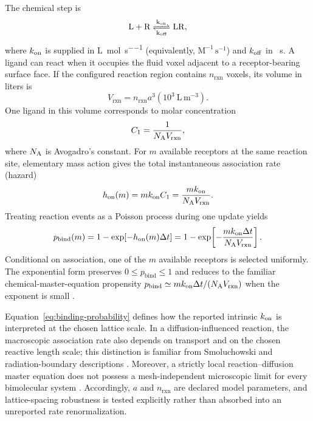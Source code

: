 The chemical step is
\begin{equation}
 \ce{L + R <=>[k_{on}][k_{off}] LR},
 \label{eq:reaction}
\end{equation}
where $k_{\mathrm{on}}$ is supplied in \si{\liter\per\mole\per\second} (equivalently,
$\mathrm{M}^{-1}\,\mathrm{s}^{-1}$) and $k_{\mathrm{off}}$ in
\si{\per\second}.  A ligand can react when it occupies the fluid voxel adjacent
to a receptor-bearing surface face.  If the configured reaction region
contains $n_{\mathrm{rxn}}$ voxels, its volume in liters is
\begin{equation}
 V_{\mathrm{rxn}}
 =n_{\mathrm{rxn}}a^3\left(10^3\ \mathrm{L\,m^{-3}}\right).
 \label{eq:reaction-volume}
\end{equation}
One ligand in this volume corresponds to molar concentration
\begin{equation}
 C_1=\frac{1}{N_{\mathrm A} V_{\mathrm{rxn}}},
 \label{eq:one-particle-concentration}
\end{equation}
where $N_{\mathrm A}$ is Avogadro's constant.  For $m$ available receptors at the same
reaction site, elementary mass action gives the total instantaneous
association rate (hazard)
\begin{equation}
 h_{\mathrm{on}}(m)=mk_{\mathrm{on}} C_1
 =\frac{mk_{\mathrm{on}}}{N_{\mathrm A} V_{\mathrm{rxn}}}.
 \label{eq:on-hazard}
\end{equation}
Treating reaction events as a Poisson process during one update yields
\begin{equation}
 p_{\mathrm{bind}}(m)
 =1-\exp[-h_{\mathrm{on}}(m)\Delta t]
 =1-\exp\!\left[-\frac{mk_{\mathrm{on}}\Delta t}{N_{\mathrm A} V_{\mathrm{rxn}}}\right].
 \label{eq:binding-probability}
\end{equation}
Conditional on association, one of the $m$ available receptors is selected
uniformly.  The exponential form preserves $0\le p_{\mathrm{bind}}\le1$ and
reduces to the familiar chemical-master-equation propensity
$p_{\mathrm{bind}}\simeq mk_{\mathrm{on}}\Delta t/(N_{\mathrm A} V_{\mathrm{rxn}})$ when the exponent is
small \citep{gillespie1976,fange2006}.

Equation~\ref{eq:binding-probability} defines how the reported intrinsic
$k_{\mathrm{on}}$ is interpreted at the chosen lattice scale.  In a diffusion-influenced
reaction, the macroscopic association rate also depends on transport and on
the chosen reactive length scale; this distinction is familiar from
Smoluchowski and radiation-boundary descriptions
\citep{collins1949,agmon1990,andrews2009}.  Moreover, a strictly local
reaction--diffusion master equation does not possess a mesh-independent
microscopic limit for every bimolecular system
\citep{isaacson2008,hellander2012}.  Accordingly, $a$ and
$n_{\mathrm{rxn}}$ are declared model parameters, and lattice-spacing
robustness is tested explicitly rather than absorbed into an unreported rate
renormalization.

